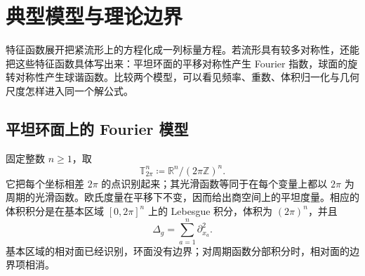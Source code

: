 \section{典型模型与理论边界}
\label{b2:sec:2606}

特征函数展开把紧流形上的方程化成一列标量方程。若流形具有较多对称性，还能把这些特征函数具体写出来：平坦环面的平移对称性产生 Fourier 指数，球面的旋转对称性产生球谐函数。比较两个模型，可以看见频率、重数、体积归一化与几何尺度怎样进入同一个解公式。

\subsection{平坦环面上的 Fourier 模型}
\label{b2:subsec:260601}

固定整数 \(n\geq1\)，取
\[
 \mathbb T_{2\pi}^n\coloneqq\mathbb R^n/(2\pi\mathbb Z)^n.
\]
它把每个坐标相差 \(2\pi\) 的点识别起来；其光滑函数等同于在每个变量上都以 \(2\pi\) 为周期的光滑函数。欧氏度量在平移下不变，因而给出商空间上的平坦度量。相应的体积积分是在基本区域 \([0,2\pi]^n\) 上的 Lebesgue 积分，体积为 \((2\pi)^n\)，并且
\[
 \Delta_g=\sum_{a=1}^n\partial_{x_a}^2.
\]
基本区域的相对面已经识别，环面没有边界；对周期函数分部积分时，相对面的边界项相消。

